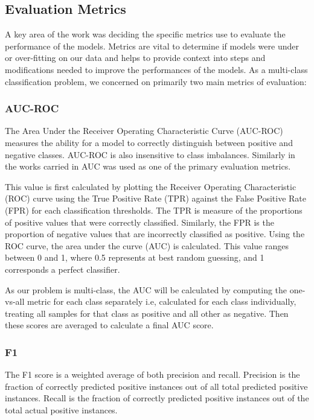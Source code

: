 \subsection{Evaluation Metrics}

A key area of the work was deciding the specific metrics use to evaluate the performance of the models. Metrics are vital to determine if models were under or over-fitting on our data and helps to provide context into steps and modifications needed to improve the performances of the models. 
As a multi-class classification problem, we concerned on primarily two main metrics of evaluation: 


\subsubsection*{AUC-ROC}

The Area Under the Receiver Operating Characteristic Curve (AUC-ROC) measures the ability for a model to correctly distinguish between positive and negative classes. AUC-ROC is also insensitive to class imbalances. Similarly in the works carried in \parencite{s22155633, pick_quality_over} AUC was used as one of the primary evaluation metrics.

\medskip

This value is first calculated by plotting the Receiver Operating Characteristic (ROC) curve using the True Positive Rate (TPR) against the False Positive Rate (FPR) for each classification thresholds. The TPR is measure of the proportions of positive values that were correctly classified. Similarly, the FPR is the proportion of negative values that are incorrectly classified as positive. Using the ROC curve, the area under the curve (AUC) is calculated. This value ranges between 0 and 1, where 0.5 represents at best random guessing, and 1 corresponds a perfect classifier.

\medskip

As our problem is multi-class, the AUC will be calculated by computing the one-vs-all metric for each class separately i.e,  calculated for each class individually, treating all samples for that class as positive and all other as negative. Then these scores are averaged to calculate a final AUC score.

\subsubsection*{F1}

The F1 score is a weighted average of both precision and recall. Precision is the fraction of correctly predicted positive instances out of all total predicted positive instances. Recall is the fraction of correctly predicted positive instances out of the total actual positive instances.

